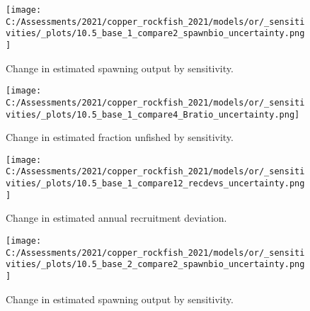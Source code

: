 \documentclass[11pt,
  english,
  a4paper,
]{article}
\begin{document}
\tagmcend\tagstructend


\begin{figure}
\centering
\texttt{[image: C:/Assessments/2021/copper\_rockfish\_2021/models/or/\_sensitivities/\_plots/10.5\_base\_1\_compare2\_spawnbio\_uncertainty.png]}
\caption{Change in estimated spawning output by sensitivity.\label{fig:sens-ssb-1}}
\end{figure}

\tagmcend\tagstructend


\begin{figure}
\centering
\texttt{[image: C:/Assessments/2021/copper\_rockfish\_2021/models/or/\_sensitivities/\_plots/10.5\_base\_1\_compare4\_Bratio\_uncertainty.png]}
\caption{Change in estimated fraction unfished by sensitivity.\label{fig:sens-depl-1}}
\end{figure}

\tagmcend\tagstructend


\begin{figure}
\centering
\texttt{[image: C:/Assessments/2021/copper\_rockfish\_2021/models/or/\_sensitivities/\_plots/10.5\_base\_1\_compare12\_recdevs\_uncertainty.png]}
\caption{Change in estimated annual recruitment deviation.\label{fig:sens-recdev-1}}
\end{figure}

\tagmcend\tagstructend


\begin{figure}
\centering
\texttt{[image: C:/Assessments/2021/copper\_rockfish\_2021/models/or/\_sensitivities/\_plots/10.5\_base\_2\_compare2\_spawnbio\_uncertainty.png]}
\caption{Change in estimated spawning output by sensitivity.\label{fig:sens-ssb-2}}
\end{figure}

\tagmcend\tagstructend
\end{document}
